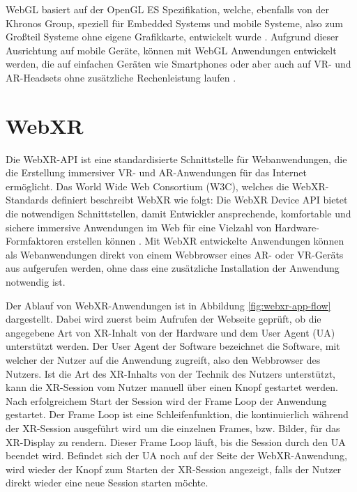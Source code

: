 WebGL basiert auf der OpenGL ES Spezifikation, welche, ebenfalls von der Khronos Group, speziell für Embedded Systems und mobile Systeme, also zum Großteil Systeme ohne eigene Grafikkarte, entwickelt wurde \autocite[]{khronos-opengles}.
Aufgrund dieser Ausrichtung auf mobile Geräte, können mit WebGL Anwendungen entwickelt werden, die auf einfachen Geräten wie Smartphones oder aber auch auf VR- und AR-Headsets ohne zusätzliche Rechenleistung laufen \autocite[][S.3]{Baruah2021}.


\section{WebXR}
\label{section:webxr}

Die WebXR-API ist eine standardisierte Schnittstelle für Webanwendungen, die die Erstellung immersiver VR- und AR-Anwendungen für das Internet ermöglicht.
Das World Wide Web Consortium (W3C), welches die WebXR-Standards definiert beschreibt WebXR wie folgt: \glqq{}Die WebXR Device API bietet die notwendigen Schnittstellen, damit Entwickler ansprechende, komfortable und sichere immersive Anwendungen im Web für eine Vielzahl von Hardware-Formfaktoren erstellen können\grqq{} \autocite[][1. Introduction]{w3c_webxr}.
Mit WebXR entwickelte Anwendungen können als Webanwendungen direkt von einem Webbrowser eines AR- oder VR-Geräts aus aufgerufen werden, ohne dass eine zusätzliche Installation der Anwendung notwendig ist.

Der Ablauf von WebXR-Anwendungen ist in Abbildung \ref{fig:webxr-app-flow} dargestellt.
Dabei wird zuerst beim Aufrufen der Webseite geprüft, ob die angegebene Art von XR-Inhalt von der Hardware und dem User Agent (UA) unterstützt werden.
Der User Agent der Software bezeichnet die Software, mit welcher der Nutzer auf die Anwendung zugreift, also den Webbrowser des Nutzers. 
Ist die Art des XR-Inhalts von der Technik des Nutzers unterstützt, kann die XR-Session vom Nutzer manuell über einen Knopf gestartet werden.
Nach erfolgreichem Start der Session wird der Frame Loop der Anwendung gestartet.
Der Frame Loop ist eine Schleifenfunktion, die kontinuierlich während der XR-Session ausgeführt wird um die einzelnen Frames, bzw. Bilder, für das XR-Display zu rendern.
Dieser Frame Loop läuft, bis die Session durch den UA beendet wird.
Befindet sich der UA noch auf der Seite der WebXR-Anwendung, wird wieder der Knopf zum Starten der XR-Session angezeigt, falls der Nutzer direkt wieder eine neue Session starten möchte.

